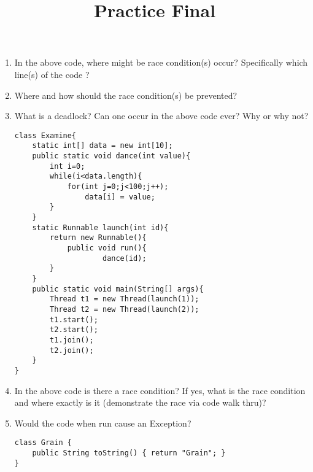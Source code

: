 \documentclass{article}
\author{}
\date{}
\title{Practice Final}
\begin{document}
\maketitle
\begin{enumerate}
\begin{lstlisting}
class Race{
	public static final int MAX = 5;
 	public static final int MIN = 1;

 	private static int data=Race.MIN;
	public static int getData(){
		return data;
	}
	public static void incData() {
		if (data < Race.MAX)
			data++;
	}
	public static void foo() throws Exception{
		while (data < Race.MAX)
			incData();
	}
}

public class Car implements Runnable { 
	public void run(){
		Race.foo();
	}
	public static void main(String[] args) throws Exception{
  		Thread t1 = new Thread(new Car());
  		Thread t2 = new Thread(new Car());
  		t1.start();
  		t2.start();
  		t1.join();
  		t2.join();
  		System.out.println(Race.getData());
 	}
}
\end{lstlisting}
	\item In the above code, where might be race condition(s) occur? Specifically which line(s) of the code ?\newline
	\item Where and how should the race condition(s) be prevented?\newline
	\item What is a deadlock? Can one occur in the above code ever? Why or why not?\newline
\newpage
\begin{lstlisting}
class Examine{
 	static int[] data = new int[10];
 	public static void dance(int value){
  		int i=0;
  		while(i<data.length){
   			for(int j=0;j<100;j++);
   				data[i] = value;
  		}
 	}
 	static Runnable launch(int id){
  		return new Runnable(){
   			public void run(){
    				dance(id);
   		}
 	}
 	public static void main(String[] args){
  		Thread t1 = new Thread(launch(1));
  		Thread t2 = new Thread(launch(2));
  		t1.start();
  		t2.start();
  		t1.join();
  		t2.join();
 	}
}
\end{lstlisting}
	\item In the above code is there a race condition? If yes, what is the race condition and where exactly is it (demonstrate the race via code walk thru)?\newline
	\item Would the code when run cause an Exception?\newline
\newpage
\begin{lstlisting}
class Grain {
  	public String toString() { return "Grain"; }
}


\end{lstlisting}
\end{enumerate}
\end{document}
